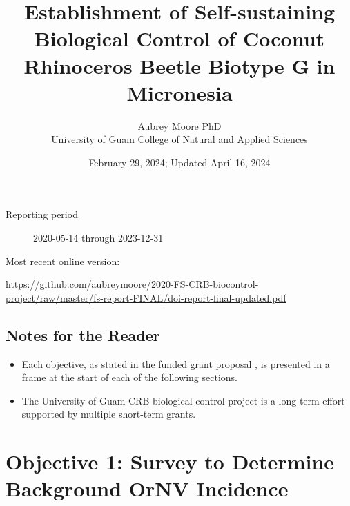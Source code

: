 \documentclass[12pt,letterpaper,english,bibliography=totocnumbered, abstract=on]{scrartcl}
\begin{document}
\titlehead{Final Report: DOI-OIA-D20AP00060}

\title{Establishment of Self-sustaining Biological Control of Coconut Rhinoceros Beetle Biotype G in Micronesia }

\author{Aubrey Moore PhD\\University of Guam College of Natural and Applied Sciences}

\date{February 29, 2024; Updated April 16, 2024}

\maketitle

\begin{description}
	\item[Reporting period] 2020-05-14 through 2023-12-31
\end{description}

Most recent online version: \\
\begin{footnotesize}	
	\url{https://github.com/aubreymoore/2020-FS-CRB-biocontrol-project/raw/master/fs-report-FINAL/doi-report-final-updated.pdf}
\end{footnotesize}

\clearpage

\tableofcontents

\clearpage


\newpage

\subsection*{Notes for the Reader}

\begin{itemize}

\item Each objective, as stated in the funded grant proposal \cite{mooreGrantProposalDOIOIA2020}, is presented in a frame at the start of each of the following sections. 

\item The University of Guam CRB biological control project is a long-term effort supported by multiple short-term grants.  

\end{itemize}

\clearpage

\section{Objective 1: Survey to Determine Background OrNV Incidence} 
\end{document}
